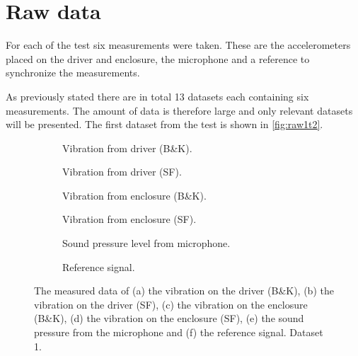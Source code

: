 \section{Raw data}
For each of the test six measurements were taken. These are the accelerometers placed on the driver and enclosure, the microphone and a reference to synchronize the measurements.

As previously stated there are in total 13 datasets each containing six measurements. The amount of data is therefore large and only
relevant datasets will be presented. The first dataset from the test is shown in \autoref{fig:raw1t2}.

\begin{figure}[H]
\centering
\begin{subfigure}[t]{0.45\textwidth}
    \centering
    
    \caption{Vibration from driver (B\&K).}
    \label{fig:raw1t2_BK_driver1}
\end{subfigure}
\begin{subfigure}[t]{0.45\textwidth}
    \centering
    
    \caption{Vibration from driver (SF).}
    \label{fig:raw1t2_SF_driver1}
\end{subfigure} 

\begin{subfigure}[t]{0.45\textwidth}
    \centering
    
    \caption{Vibration from enclosure (B\&K).}
    \label{fig:raw1t2_BK_enclosure1}
\end{subfigure}
\begin{subfigure}[t]{0.45\textwidth}
    \centering
    
    \caption{Vibration from enclosure (SF).}
    \label{fig:raw1t2_SF_enclosure1}
\end{subfigure}

\begin{subfigure}[t]{0.45\textwidth}
    \centering
    
    \caption{Sound pressure level from microphone.}
    \label{fig:raw1t2_mic1}
\end{subfigure}
\begin{subfigure}[t]{0.45\textwidth}
    \centering
    
    \caption{Reference signal.}
    \label{fig:raw1t2_reference1}
\end{subfigure}

\caption{The measured data of (a) the vibration on the driver (B\&K), (b) the vibration on the driver (SF), (c) the vibration on the enclosure (B\&K), (d) the vibration on the enclosure (SF), (e) the sound pressure from the microphone and (f) the reference signal. Dataset 1.}
\label{fig:raw1t2}
\end{figure} 

